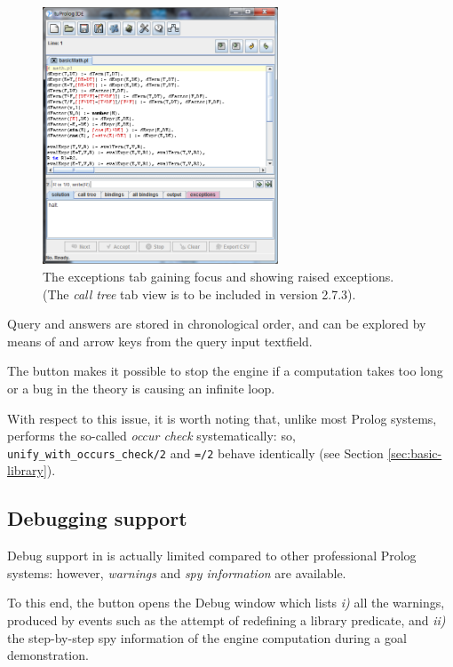 \begin{figure}
\centering
\includegraphics[width=7cm]{images/gui-exceptions}
\caption{The exceptions tab gaining focus and showing raised exceptions.
(The \textit{call tree} tab view is to be included in version 2.7.3).}
\label{fig:gui-exceptions}
\end{figure}
Query and answers are stored in chronological order, and can be explored by means of  and  arrow keys from the query input textfield.

The  button makes it possible to stop the engine if a computation takes too long or a bug in the theory is causing an infinite loop.

With respect to this issue, it is worth noting that, unlike most Prolog systems, \tuprolog{} performs the so-called \textit{occur check} systematically: so, \texttt{unify\_with\_occurs\_check/2} and \texttt{=/2} behave identically (see Section \ref{sec:basic-library}).

\subsection{Debugging support}
\label{ssec:debugging-support}

Debug support in \tuprolog{} is actually limited compared to other professional Prolog systems: however, \textit{warnings} and \textit{spy information} are available.

To this end, the  button opens the Debug window which lists \textit{i)} all the warnings, produced by events such as the attempt of redefining a library predicate, and \textit{ii)} the step-by-step spy information of the engine computation during a goal demonstration.

